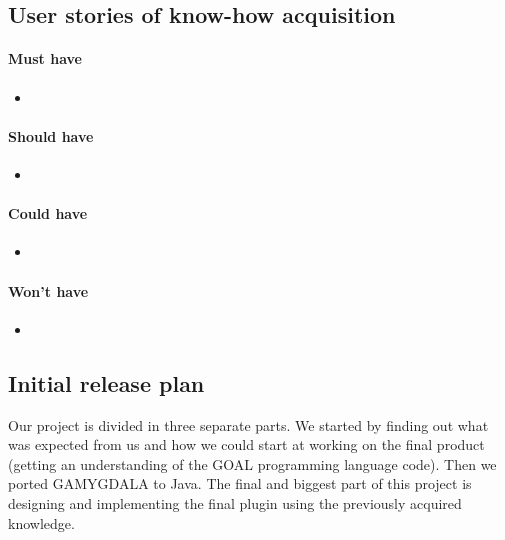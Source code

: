 \subsection{User stories of know-how acquisition}
\paragraph{Must have} 
\begin{itemize}
\item 
\end{itemize}

\paragraph{Should have} 
\begin{itemize}
\item
\end{itemize}

\paragraph{Could have} 
\begin{itemize}
\item
\end{itemize}

\paragraph{Won't have} 
\begin{itemize}
\item
\end{itemize}

\subsection{Initial release plan}
Our project is divided in three separate parts. We started by finding out what was expected from us and how we could start at working on the final product (getting an understanding of the GOAL programming language code). Then we ported GAMYGDALA to Java. The final and biggest part of this project is designing and implementing the final plugin using the previously acquired knowledge.